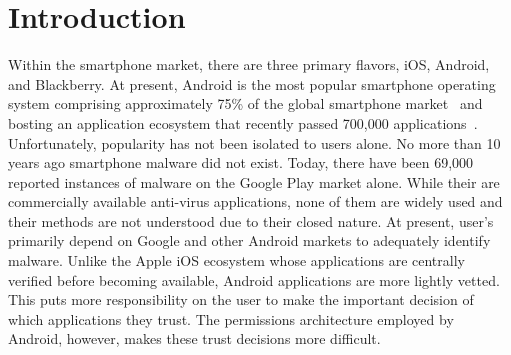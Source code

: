 \chapter{Introduction}



Within the smartphone market, there are three primary flavors, iOS, Android, and Blackberry.  At present, Android is the most popular smartphone operating system comprising approximately 75\% of the global smartphone market~\cite{Perez} and bosting an application ecosystem that recently passed 700,000 applications~\cite{Womack}.  Unfortunately, popularity has not been isolated to users alone.  No more than 10 years ago smartphone malware did not exist.  Today, there have been 69,000~\cite{networkworld} reported instances of malware on the Google Play market alone.  While their are commercially available anti-virus applications, none of them are widely used and their methods are not understood due to their closed nature.  At present, user's primarily depend on Google and other Android markets to adequately identify malware.  Unlike the Apple iOS ecosystem whose applications are centrally verified before becoming available, Android applications are more lightly vetted.  This puts more responsibility on the user to make the important decision of which applications they trust.  The permissions architecture employed by Android, however, makes these trust decisions more difficult.  

